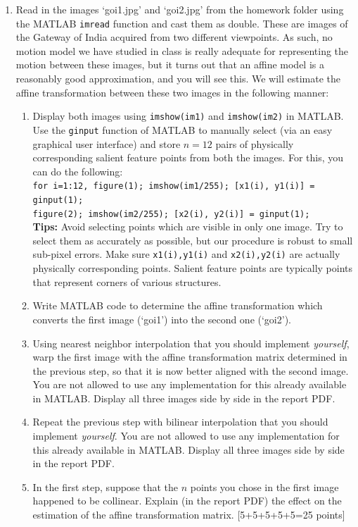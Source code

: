 \documentclass[11pt]{article}
\begin{document}
\begin{enumerate}
\item Read in the images `goi1.jpg' and `goi2.jpg' from the homework folder using the MATLAB \texttt{imread} function and cast them as double. These are images of the Gateway of India acquired from two different viewpoints. As such, no motion model we have studied in class is really adequate for representing the motion between these images, but it turns out that an affine model is a reasonably good approximation, and you will see this. We will estimate the affine transformation between these two images in the following manner:
\begin{enumerate}
\item Display both images using \texttt{imshow(im1)} and \texttt{imshow(im2)} in MATLAB. Use the \texttt{ginput} function of MATLAB to manually select (via an easy graphical user interface) and store $n = 12$ pairs of physically corresponding salient feature points from both the images. For this, you can do the following: \\
\texttt{for i=1:12, figure(1); imshow(im1/255); [x1(i), y1(i)] = ginput(1); \\ figure(2); imshow(im2/255); [x2(i), y2(i)] = ginput(1);}\\
\textbf{Tips:} Avoid selecting points which are visible in only one image. Try to select them as accurately as possible, but our procedure is robust to small sub-pixel errors. Make sure \texttt{x1(i),y1(i)} and \texttt{x2(i),y2(i)} are actually physically corresponding points. Salient feature points are typically points that represent corners of various structures. 
\item Write MATLAB code to determine the affine transformation which converts the first image (`goi1') into the second one (`goi2'). 
\item Using nearest neighbor interpolation that you should implement \emph{yourself}, warp the first image with the affine transformation matrix determined in the previous step, so that it is now better aligned with the second image. You are not allowed to use any implementation for this already available in MATLAB. Display all three images side by side in the report PDF.
\item Repeat the previous step with bilinear interpolation that you should implement \emph{yourself}. You are not allowed to use any implementation for this already available in MATLAB. Display all three images side by side in the report PDF.
\item In the first step, suppose that the $n$ points you chose in the first image happened to be collinear. Explain (in the report PDF) the effect on the estimation of the affine transformation matrix. 
\textsf{[5+5+5+5+5=25 points]}
\end{enumerate}


\end{enumerate}
\end{document}
